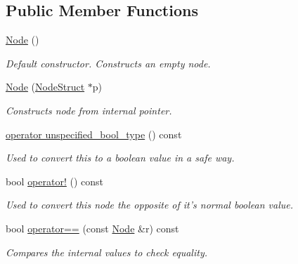 \subsection*{Public Member Functions}
\begin{DoxyCompactItemize}
\item 
\hypertarget{classphys_1_1xml_1_1Node_a82203e57f13363aee523feb696f64bb9}{
\hyperlink{classphys_1_1xml_1_1Node_a82203e57f13363aee523feb696f64bb9}{Node} ()}
\label{d7/d0a/classphys_1_1xml_1_1Node_a82203e57f13363aee523feb696f64bb9}

\begin{DoxyCompactList}\small\item\em Default constructor. Constructs an empty node. \item\end{DoxyCompactList}\item 
\hyperlink{classphys_1_1xml_1_1Node_aaefbe98a05a7bf304612c3e7f7556f42}{Node} (\hyperlink{structphys_1_1xml_1_1NodeStruct}{NodeStruct} $\ast$p)
\begin{DoxyCompactList}\small\item\em Constructs node from internal pointer. \item\end{DoxyCompactList}\item 
\hyperlink{classphys_1_1xml_1_1Node_a1a3af56736ef4dd39596bb71607ebbc7}{operator unspecified\_\-bool\_\-type} () const 
\begin{DoxyCompactList}\small\item\em Used to convert this to a boolean value in a safe way. \item\end{DoxyCompactList}\item 
bool \hyperlink{classphys_1_1xml_1_1Node_a11c8e41002682a2742bd168a9318b6e8}{operator!} () const 
\begin{DoxyCompactList}\small\item\em Used to convert this node the opposite of it's normal boolean value. \item\end{DoxyCompactList}\item 
bool \hyperlink{classphys_1_1xml_1_1Node_a5ae85504c26f8494c0ba048dc2370ac2}{operator==} (const \hyperlink{classphys_1_1xml_1_1Node}{Node} \&r) const 
\begin{DoxyCompactList}\small\item\em Compares the internal values to check equality. \item\end{DoxyCompactList}\item 

\end{DoxyCompactItemize}
